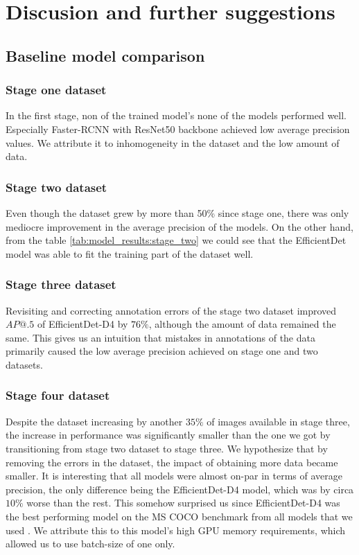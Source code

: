 \chapter{Discusion and further suggestions}
\section{Baseline model comparison}
\subsection{Stage one dataset}
In the first stage, non of the trained model's none of the models performed well. Especially Faster-RCNN with ResNet50 backbone achieved low average precision values. We attribute it to inhomogeneity in the dataset and the low amount of data.

\subsection{Stage two dataset}
Even though the dataset grew by more than 50\% since stage one, there was only mediocre improvement in the average precision of the models. On the other hand, from the table \ref{tab:model_results:stage_two} we could see that the EfficientDet model was able to fit the training part of the dataset well.

\subsection{Stage three dataset}
Revisiting and correcting annotation errors of the stage two dataset improved $AP@.5$ of EfficientDet-D4 by $76\%$, although the amount of data remained the same. This gives us an intuition that mistakes in annotations of the data primarily caused the low average precision achieved on stage one and two datasets.

\subsection{Stage four dataset}
Despite the dataset increasing by another $35\%$ of images available in stage three, the increase in performance was significantly smaller than the one we got by transitioning from stage two dataset to stage three. We hypothesize that by removing the errors in the dataset, the impact of obtaining more data became smaller. It is interesting that all models were almost on-par in terms of average precision, the only difference being the EfficientDet-D4 model, which was by circa $10\%$ worse than the rest. This somehow surprised us since EfficientDet-D4 was the best performing model on the MS COCO benchmark from all models that we used \cite{paperwithcode}. We attribute this to this model's high GPU memory requirements, which allowed us to use batch-size of one only.

